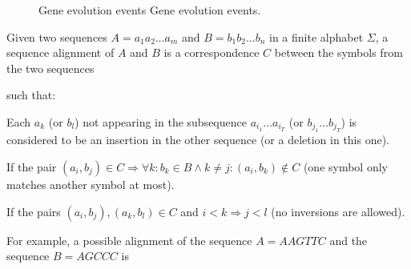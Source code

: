 \begin{figure}[t!]
\begin{center}
\setlength{\fboxsep}{0pt}
          {Gene evolution events}%
          {Gene evolution events.}%
          {}
\end{center}
\end{figure}

\label{subsec:alignments}

Given two sequences $A = a_1 a_2 \ldots a_m$ and $B = b_1 b_2 \ldots b_n$ in a finite alphabet 
$\Sigma$, a sequence alignment 
 
of $A$ and $B$ is a correspondence $C$ between the symbols from the two
sequences 


\begin{center}
\end{center}
such that:
\begin{menumerate}
\item
Each $a_k$ (or $b_l$) not appearing in the subsequence $a_{i_1} \ldots a_{i_T}$ (or $b_{j_1} \ldots b_{j_T}$)
is considered to be an insertion in the other sequence (or a deletion in this one).
\item
If the pair $(a_i,b_j) \in C \Rightarrow \forall k: b_k \in B \wedge k \neq j: (a_i,b_k) \notin C$
(one symbol only matches another symbol at most).
\item
If the pairs $(a_i,b_j),(a_k,b_l) \in C$ and $i<k \Rightarrow j<l$ (no inversions are allowed).
\end{menumerate}

For example, a possible alignment of the sequence $A=AAGTTC$ and the sequence $B=AGCCC$ is
\begin{center}
\end{center}

